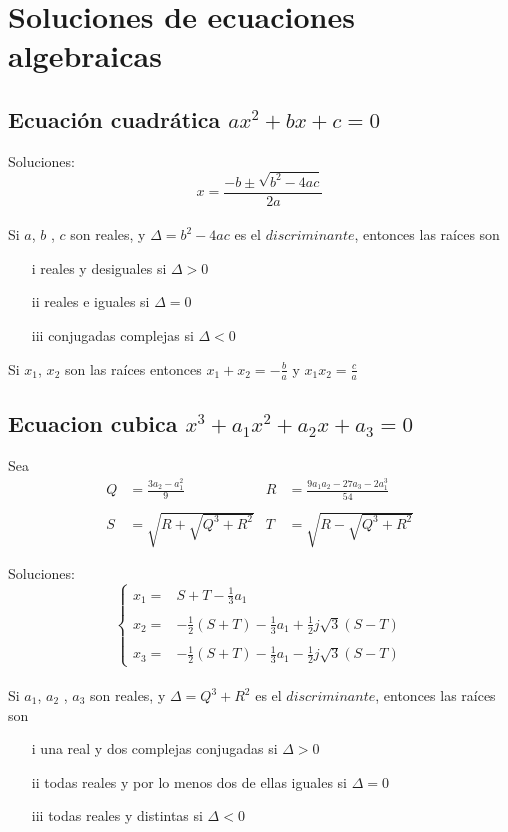 \chapter*{Soluciones de ecuaciones algebraicas}

\section*{Ecuación cuadrática $ax^2+bx+c=0$}

Soluciones: 
$$x=\frac{-b\pm\sqrt{b^2-4ac}}{2a}$$
\\
Si $a$, $b$ , $c$ son reales, y $\Delta=b^2-4ac$ es el $discriminante$, entonces las raíces son
\begin{enumerate}
\item[i] reales y desiguales si $\Delta > 0$
\item[ii] reales e iguales si $\Delta = 0$
\item[iii] conjugadas complejas si $\Delta < 0$
\end{enumerate}

Si $x_1$, $x_2$ son las raíces entonces $x_1+x_2=-\frac{b}{a}$ y $x_1x_2=\frac{c}{a}$
\section*{Ecuacion cubica $x^3+a_1x^2+a_2x+a_3=0$}

Sea 
\begin{align*}
Q &=\frac{3a_2-a_1^2}{9}              &  R&=\frac{9a_1a_2-27a_3-2a_1^3}{54}\\\\
S&=\sqrt{R+\sqrt{Q^3+R^2}}   &  T&=\sqrt{R-\sqrt{Q^3+R^2}}
\end{align*}

Soluciones:
$$\left\{\begin{matrix}
x_1= & S+T-\frac{1}{3}a_1\,\,\,\,\,\,\,\,\,\,\,\,\,\,\,\,\,\,\,\,\,\,\,\,\,\,\,\,\,\,\,\,\,\,\,\,\,\,\,\,\,\,\,\,\,\\ \\
x_2= & -\frac{1}{2}(S+T)-\frac{1}{3}a_1+\frac{1}{2}j\sqrt{3}(S-T)\\ \\
x_3= & -\frac{1}{2}(S+T)-\frac{1}{3}a_1-\frac{1}{2}j\sqrt{3}(S-T)
\end{matrix}\right.$$
\\
Si $a_1$, $a_2$ , $a_3$ son reales, y $\Delta=Q^3+R^2$ es el $discriminante$, entonces las raíces son
\begin{enumerate}
\item[i] una real y dos complejas conjugadas si $\Delta > 0$
\item[ii] todas reales y por lo menos dos de ellas iguales si $\Delta = 0$
\item[iii] todas reales y distintas si $\Delta < 0$
\end{enumerate}


